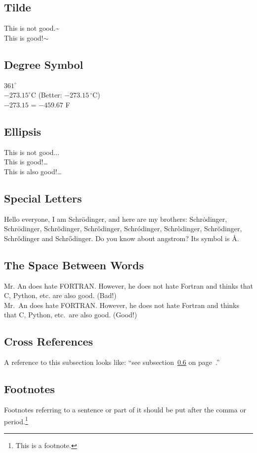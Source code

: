 \documentclass[a4paper,10pt]{article}
\begin{document}
    \subsection{Tilde}
    This is not good.\~{}\\
    This is good!$\sim$
    \subsection{Degree Symbol}
    $361^{\circ}$\\
    $-273.15^{\circ}\mathrm{C}$ (Better: $-273.15\,^{\circ}\mathrm{C}$)\\
    $-273.15$ \textcelsius{} = $-459.67$ \textdegree{}F
    \subsection{Ellipsis}
    This is not good...\\
    This is good!\dots{}\\
    This is also good!\ldots{}
    \subsection{Special Letters}
    Hello everyone, I am Schr\"{o}dinger, and here are my brothers:
    Schr\.{o}dinger, Schr\={o}dinger, Schr\~{o}dinger,
    Schr\^{o}dinger, Schr\'{o}dinger, Schr\`{o}dinger,
    Schr\u{o}dinger, Schr\v{o}dinger and Schr\H{o}dinger.
    Do you know about angstrom? Its symbol is \AA{}.
    \subsection{The Space Between Words}
    Mr. An does hate FORTRAN. However, he does not hate Fortran and thinks that C, Python, etc. are also good. (Bad!)\\
    Mr.~An does hate FORTRAN\@. However, he does not hate Fortran and thinks that C, Python, etc.\ are also good. (Good!)
    \subsection{Cross References}\label{ref}
    A reference to this subsection looks like:
    ``see subsection~\ref{ref} on page~\pageref{ref}.''
    \subsection{Footnotes}
    Footnotes referring to a sentence or part of it should be put
    after the comma or period.\footnote{This is a footnote.}
\end{document}
